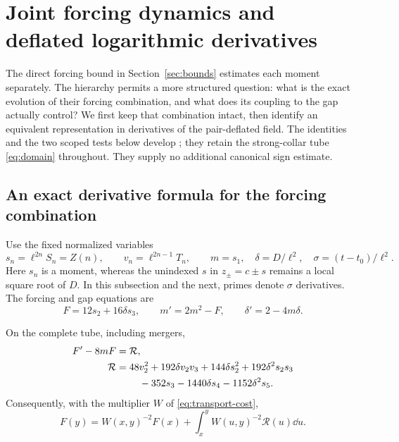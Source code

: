 \section{Joint forcing dynamics and deflated logarithmic derivatives}
\label{sec:joint}

The direct forcing bound in Section~\ref{sec:bounds} estimates each moment
separately. The hierarchy permits a more structured question: what is the
exact evolution of their forcing combination, and what does its coupling
to the gap actually control? We first keep that combination intact, then
identify an equivalent representation in derivatives of the pair-deflated
field. The identities and the two scoped tests below develop
\cite{BakerCM13}; they retain the strong-collar tube
\eqref{eq:domain} throughout. They supply no additional canonical sign
estimate.

\subsection{An exact derivative formula for the forcing combination}

Use the fixed normalized variables
\begin{equation}
 s_n=\ell^{2n}S_n=Z(n),\qquad
 v_n=\ell^{2n-1}T_n,\qquad
 m=s_1,\quad \delta=D/\ell^2,\quad
 \sigma=(t-t_0)/\ell^2.
 \label{joint:normalization}
\end{equation}
Here $s_n$ is a moment, whereas the unindexed $s$ in $z_\pm=c\pm s$
remains a local square root of $D$. In this subsection and the next,
primes denote $\sigma$ derivatives. The forcing and gap equations are
\begin{equation}
 F=12s_2+16\delta s_3,\qquad m'=2m^2-F,\qquad
 \delta'=2-4m\delta.
 \label{joint:system}
\end{equation}

\begin{proposition}\label{joint:forcing-prop}
On the complete tube, including mergers,
\begin{align}
 F'-8mF={}&\mathcal R,\label{joint:forcing-law}\\
 \mathcal R={}&48v_2^2+192\delta v_2v_3+144\delta s_2^2
       +192\delta^2s_2s_3\notag\\
       &\quad-352s_3-1440\delta s_4-1152\delta^2s_5.
       \label{joint:remainder}
\end{align}
Consequently, with the multiplier $W$ of \eqref{eq:transport-cost},
\begin{equation}
 F(y)=W(x,y)^{-2}F(x)
       +\int_x^y W(u,y)^{-2}\mathcal R(u)\dd u.
 \label{joint:forcing-integral}
\end{equation}
\end{proposition}


